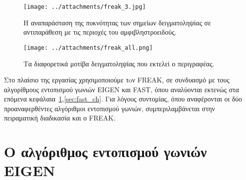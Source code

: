 \newpage

 \begin{figure}[!ht]
\begin{minipage}[c]{1.0\textwidth}
\centering
\texttt{[image: ../attachments/freak\_3.jpg]}

\end{minipage}
\caption{H αναπαράσταση της πυκνότητας των σημείων δειγματοληψίας σε αντιπαράθεση με τις περιοχές του αμφιβληστροειδούς.}
\label{fig:freak_2}
\end{figure}

\vspace{2cm}

\begin{figure}[!ht]
\begin{minipage}[c]{1.0\textwidth}
\centering
\texttt{[image: ../attachments/freak\_all.png]}
\caption{Τα διαφορετικά μοτίβα δειγματοληψίας που εκτελεί ο περιγραφέας.}
\label{fig:freak_3}
\end{minipage}
\end{figure}







Στο πλαίσιο της εργασίας χρησιμοποιούμε τoν FREAΚ, σε συνδυασμό με τους αλγορίθμους εντοπισμού γωνιών EIGEN και FAST, όπου αναλύονται εκτενώς στα επόμενα κεφάλαια~\ref{sec:eigen_ch},\ref{sec:fast_ch}.
Για λόγους συντομίας, όπου αναφέρονται οι δύο προαναφερθέντες αλγόριθμοι εντοπισμού γωνιών, συμπεριλαμβάνεται στην πειραματική διαδικασία και ο FREAK.

\newpage

\section{Ο αλγόριθμος εντοπισμού γωνιών EIGEN}
\label{sec:eigen_ch}
\vspace{1.5cm}

